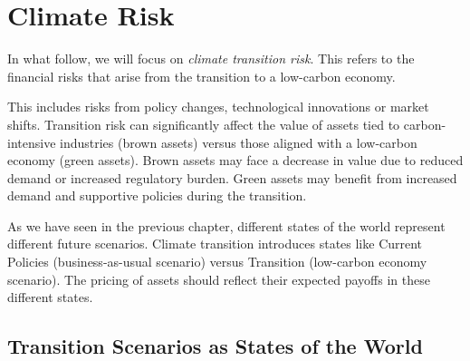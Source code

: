 \chapter{Climate Risk}

In what follow, we will focus on \textit{climate transition risk}. 
This refers to the financial risks that arise from the transition 
to a low-carbon economy. 

This includes risks from policy changes, technological innovations or 
market shifts. Transition risk can significantly 
affect the value of assets tied to carbon-intensive industries 
(brown assets) versus those aligned with a low-carbon economy (green assets).
Brown assets may face a decrease in value 
due to reduced demand or increased regulatory burden.
Green assets may benefit from increased demand and supportive 
policies during the transition.

As we have seen in the previous chapter, 
different states of the world represent different future 
scenarios. Climate transition introduces states 
like Current Policies (business-as-usual scenario) versus
Transition (low-carbon economy scenario). The pricing of assets 
should reflect their expected payoffs in these different states.



\section{Transition Scenarios as States of the World}

